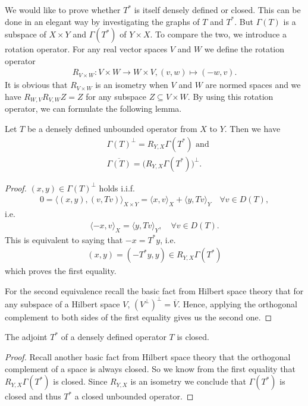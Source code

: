 \documentclass[../master_thesis.tex]{subfiles}
\begin{document}
We would like to prove whether $T^*$ is itself densely defined or closed. 
This can be done in an elegant way by investigating the graphs of $T$ and 
$T^*$. But $\Gamma(T)$ is a subspace of $X\times Y$ and 
$\Gamma(T^*)$ of $Y\times X$. To compare the two, we introduce a rotation operator. 
For any real vector spaces $V$ and $W$ we define the rotation operator 
\begin{align*}
    R_{V\times W}: V\times W \rightarrow W \times V, (v,w) \mapsto (-w,v).
\end{align*}
It is obvious that $R_{V\times W}$ is an isometry when $V$ and $W$ are normed spaces  
and we have $R_{W,V}R_{V,W}Z = Z$ for any subspace $Z\subseteq V\times W$.
By using this rotation operator, we can formulate the following lemma.
\begin{lemma}\label{lem:rotated_graph}
    Let $T$ be a densely defined unbounded operator from $X$ to $Y$. 
    Then we have 
    \begin{align*}
        & \Gamma(T)^\perp = R_{Y,X}\Gamma(T^*) \text{ and}
        \\ &\overline{\Gamma(T)} = \big(R_{Y,X}\Gamma(T^*)\big)^\perp.
    \end{align*}
\end{lemma}
\begin{proof}
    $(x,y) \in \Gamma(T)^\perp$ holds i.i.f. 
    \begin{align*}
        0 = \langle (x,y), (v,Tv) \rangle _{X\times Y}
        = \langle x, v \rangle _X + \langle y, Tv \rangle _Y
            \quad \forall v \in D(T),
    \end{align*}
    i.e. 
    \begin{align*}
        \langle -x, v \rangle _X = \langle y, Tv \rangle _Y,
            \quad \forall v \in D(T).
    \end{align*}
    This is equivalent to saying that $-x = T^*y$, i.e.
    \begin{align*}
        (x,y) = (-T^*y,y) \in R_{Y,X}\Gamma(T^*)
    \end{align*}
    which proves the first equality.

    For the second equivalence recall the basic fact from Hilbert space theory
    that for any subspace of a Hilbert space $V$,
    $(V^\perp)^\perp = \overline{V}$. Hence, applying the orthogonal 
    complement to both sides of the first equality gives us the second one.
\end{proof}

\begin{corollary}\label{cor:adjoint_of_densely_defined}
    The adjoint $T^*$ of a densely defined operator $T$ is closed. 
\end{corollary}
\begin{proof}
    Recall another basic fact from Hilbert space theory that the 
    orthogonal complement of a space is always closed. 
    So we know from the first equality that $R_{Y,X}\Gamma(T^*)$ is closed.
    Since $R_{Y,X}$ is an isometry we conclude that $\Gamma(T^*)$ is closed and 
    thus $T^*$ a closed unbounded operator.
\end{proof}
\end{document}
